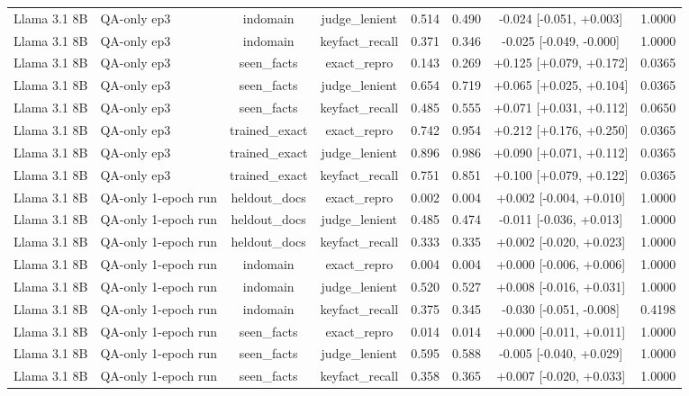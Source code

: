 \begin{table}[t]
{\begin{tabular}{llcccccc}
Llama 3.1 8B & QA-only ep3 & indomain & judge\_lenient & 0.514 & 0.490 & -0.024 [-0.051, +0.003] & 1.0000 \\
Llama 3.1 8B & QA-only ep3 & indomain & keyfact\_recall & 0.371 & 0.346 & -0.025 [-0.049, -0.000] & 1.0000 \\
Llama 3.1 8B & QA-only ep3 & seen\_facts & exact\_repro & 0.143 & 0.269 & +0.125 [+0.079, +0.172] & 0.0365 \\
Llama 3.1 8B & QA-only ep3 & seen\_facts & judge\_lenient & 0.654 & 0.719 & +0.065 [+0.025, +0.104] & 0.0365 \\
Llama 3.1 8B & QA-only ep3 & seen\_facts & keyfact\_recall & 0.485 & 0.555 & +0.071 [+0.031, +0.112] & 0.0650 \\
Llama 3.1 8B & QA-only ep3 & trained\_exact & exact\_repro & 0.742 & 0.954 & +0.212 [+0.176, +0.250] & 0.0365 \\
Llama 3.1 8B & QA-only ep3 & trained\_exact & judge\_lenient & 0.896 & 0.986 & +0.090 [+0.071, +0.112] & 0.0365 \\
Llama 3.1 8B & QA-only ep3 & trained\_exact & keyfact\_recall & 0.751 & 0.851 & +0.100 [+0.079, +0.122] & 0.0365 \\
Llama 3.1 8B & QA-only 1-epoch run & heldout\_docs & exact\_repro & 0.002 & 0.004 & +0.002 [-0.004, +0.010] & 1.0000 \\
Llama 3.1 8B & QA-only 1-epoch run & heldout\_docs & judge\_lenient & 0.485 & 0.474 & -0.011 [-0.036, +0.013] & 1.0000 \\
Llama 3.1 8B & QA-only 1-epoch run & heldout\_docs & keyfact\_recall & 0.333 & 0.335 & +0.002 [-0.020, +0.023] & 1.0000 \\
Llama 3.1 8B & QA-only 1-epoch run & indomain & exact\_repro & 0.004 & 0.004 & +0.000 [-0.006, +0.006] & 1.0000 \\
Llama 3.1 8B & QA-only 1-epoch run & indomain & judge\_lenient & 0.520 & 0.527 & +0.008 [-0.016, +0.031] & 1.0000 \\
Llama 3.1 8B & QA-only 1-epoch run & indomain & keyfact\_recall & 0.375 & 0.345 & -0.030 [-0.051, -0.008] & 0.4198 \\
Llama 3.1 8B & QA-only 1-epoch run & seen\_facts & exact\_repro & 0.014 & 0.014 & +0.000 [-0.011, +0.011] & 1.0000 \\
Llama 3.1 8B & QA-only 1-epoch run & seen\_facts & judge\_lenient & 0.595 & 0.588 & -0.005 [-0.040, +0.029] & 1.0000 \\
Llama 3.1 8B & QA-only 1-epoch run & seen\_facts & keyfact\_recall & 0.358 & 0.365 & +0.007 [-0.020, +0.033] & 1.0000 \\

\end{tabular}}
\end{table}
